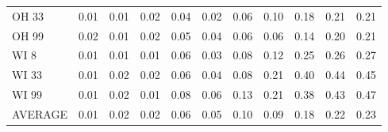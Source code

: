 \begin{tabular}{lrrrrrrrrrr}
OH 33   &     0.01 &     0.01 &     0.02 &   0.04 &   0.02 &   0.06 &  0.10 &   0.18 &    0.21 &     0.21 \\
OH 99   &     0.02 &     0.01 &     0.02 &   0.05 &   0.04 &   0.06 &  0.06 &   0.14 &    0.20 &     0.21 \\
WI 8    &     0.01 &     0.01 &     0.01 &   0.06 &   0.03 &   0.08 &  0.12 &   0.25 &    0.26 &     0.27 \\
WI 33   &     0.01 &     0.02 &     0.02 &   0.06 &   0.04 &   0.08 &  0.21 &   0.40 &    0.44 &     0.45 \\
WI 99   &     0.01 &     0.02 &     0.01 &   0.08 &   0.06 &   0.13 &  0.21 &   0.38 &    0.43 &     0.47 \\
AVERAGE &     0.01 &     0.02 &     0.02 &   0.06 &   0.05 &   0.10 &  0.09 &   0.18 &    0.22 &     0.23 \\
\bottomrule
\end{tabular}
